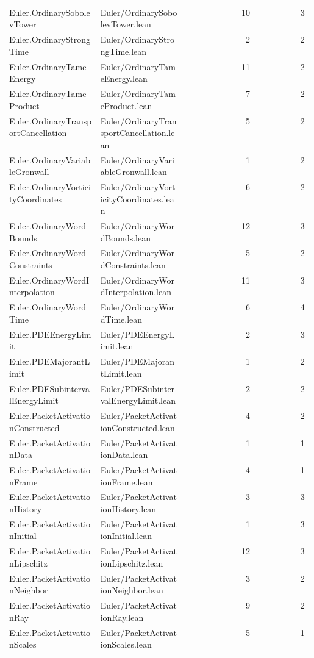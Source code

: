 \begin{longtable}{p{0.30\linewidth}p{0.28\linewidth}rr}
Euler.OrdinarySobolevTower & Euler/OrdinarySobolevTower.lean & 10 & 3\\
Euler.OrdinaryStrongTime & Euler/OrdinaryStrongTime.lean & 2 & 2\\
Euler.OrdinaryTameEnergy & Euler/OrdinaryTameEnergy.lean & 11 & 2\\
Euler.OrdinaryTameProduct & Euler/OrdinaryTameProduct.lean & 7 & 2\\
Euler.OrdinaryTransportCancellation & Euler/OrdinaryTransportCancellation.lean & 5 & 2\\
Euler.OrdinaryVariableGronwall & Euler/OrdinaryVariableGronwall.lean & 1 & 2\\
Euler.OrdinaryVorticityCoordinates & Euler/OrdinaryVorticityCoordinates.lean & 6 & 2\\
Euler.OrdinaryWordBounds & Euler/OrdinaryWordBounds.lean & 12 & 3\\
Euler.OrdinaryWordConstraints & Euler/OrdinaryWordConstraints.lean & 5 & 2\\
Euler.OrdinaryWordInterpolation & Euler/OrdinaryWordInterpolation.lean & 11 & 3\\
Euler.OrdinaryWordTime & Euler/OrdinaryWordTime.lean & 6 & 4\\
Euler.PDEEnergyLimit & Euler/PDEEnergyLimit.lean & 2 & 3\\
Euler.PDEMajorantLimit & Euler/PDEMajorantLimit.lean & 1 & 2\\
Euler.PDESubintervalEnergyLimit & Euler/PDESubintervalEnergyLimit.lean & 2 & 2\\
Euler.PacketActivationConstructed & Euler/PacketActivationConstructed.lean & 4 & 2\\
Euler.PacketActivationData & Euler/PacketActivationData.lean & 1 & 1\\
Euler.PacketActivationFrame & Euler/PacketActivationFrame.lean & 4 & 1\\
Euler.PacketActivationHistory & Euler/PacketActivationHistory.lean & 3 & 3\\
Euler.PacketActivationInitial & Euler/PacketActivationInitial.lean & 1 & 3\\
Euler.PacketActivationLipschitz & Euler/PacketActivationLipschitz.lean & 12 & 3\\
Euler.PacketActivationNeighbor & Euler/PacketActivationNeighbor.lean & 3 & 2\\
Euler.PacketActivationRay & Euler/PacketActivationRay.lean & 9 & 2\\
Euler.PacketActivationScales & Euler/PacketActivationScales.lean & 5 & 1\\

\end{longtable}
